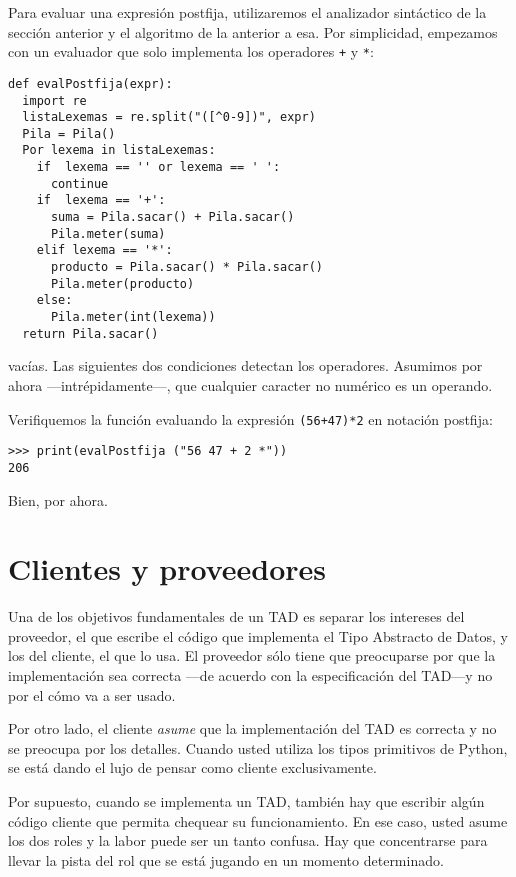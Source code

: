 Para evaluar una expresión postfija, utilizaremos el analizador sintáctico
de la sección anterior y el algoritmo de la anterior a esa. Por simplicidad,
empezamos con un evaluador que solo implementa los operadores \texttt{+}
y \texttt{{*}}:


\begin{verbatim}
def evalPostfija(expr):
  import re
  listaLexemas = re.split("([^0-9])", expr)
  Pila = Pila()
  Por lexema in listaLexemas:
    if  lexema == '' or lexema == ' ':
      continue
    if  lexema == '+':
      suma = Pila.sacar() + Pila.sacar()
      Pila.meter(suma)
    elif lexema == '*':
      producto = Pila.sacar() * Pila.sacar()
      Pila.meter(producto)
    else:
      Pila.meter(int(lexema))
  return Pila.sacar()
\end{verbatim}
vacías. Las siguientes dos condiciones detectan los operadores. Asumimos
por ahora —intrépidamente—, que cualquier caracter no numérico es
un operando.

Verifiquemos la función evaluando la expresión \texttt{(56+47){*}2}
en notación postfija:

\beforeverb 
\begin{verbatim}
>>> print(evalPostfija ("56 47 + 2 *"))
206
\end{verbatim}
\afterverb Bien, por ahora.

\section{Clientes y proveedores}

 

Una de los objetivos fundamentales de un TAD es separar los intereses
del proveedor, el que escribe el código que implementa el Tipo Abstracto
de Datos, y los del cliente, el que lo usa. El proveedor sólo tiene
que preocuparse por que la implementación sea correcta —de acuerdo
con la especificación del TAD—y no por el cómo va a ser usado.

Por otro lado, el cliente {\em asume} que la implementación del
TAD es correcta y no se preocupa por los detalles. Cuando usted utiliza
los tipos primitivos de Python, se está dando el lujo de pensar como
cliente exclusivamente.

Por supuesto, cuando se implementa un TAD, también hay que escribir
algún código cliente que permita chequear su funcionamiento. En ese
caso, usted asume los dos roles y la labor puede ser un tanto confusa.
Hay que concentrarse para llevar la pista del rol que se está jugando
en un momento determinado.

